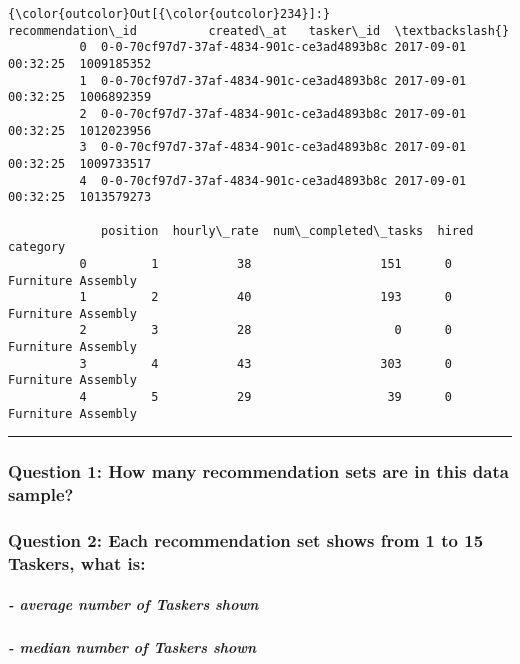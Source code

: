 \documentclass[11pt]{article}
\begin{document}
\begin{Verbatim}[commandchars=\\\{\}]
{\color{outcolor}Out[{\color{outcolor}234}]:}                           recommendation\_id          created\_at   tasker\_id  \textbackslash{}
          0  0-0-70cf97d7-37af-4834-901c-ce3ad4893b8c 2017-09-01 00:32:25  1009185352   
          1  0-0-70cf97d7-37af-4834-901c-ce3ad4893b8c 2017-09-01 00:32:25  1006892359   
          2  0-0-70cf97d7-37af-4834-901c-ce3ad4893b8c 2017-09-01 00:32:25  1012023956   
          3  0-0-70cf97d7-37af-4834-901c-ce3ad4893b8c 2017-09-01 00:32:25  1009733517   
          4  0-0-70cf97d7-37af-4834-901c-ce3ad4893b8c 2017-09-01 00:32:25  1013579273   
          
             position  hourly\_rate  num\_completed\_tasks  hired            category  
          0         1           38                  151      0  Furniture Assembly  
          1         2           40                  193      0  Furniture Assembly  
          2         3           28                    0      0  Furniture Assembly  
          3         4           43                  303      0  Furniture Assembly  
          4         5           29                   39      0  Furniture Assembly  
\end{Verbatim}
            
    \begin{center}\rule{0.5\linewidth}{\linethickness}\end{center}

\subsubsection{Question 1: How many recommendation sets are in this data
sample?}\label{question-1-how-many-recommendation-sets-are-in-this-data-sample}

\subsubsection{Question 2: Each recommendation set shows from 1 to 15
Taskers, what
is:}\label{question-2-each-recommendation-set-shows-from-1-to-15-taskers-what-is}

\subparagraph{- average number of Taskers
shown}\label{average-number-of-taskers-shown}

\subparagraph{- median number of Taskers
shown}\label{median-number-of-taskers-shown}
\end{document}
